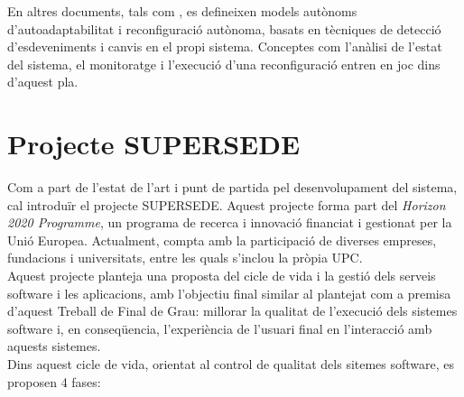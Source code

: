 En altres documents, tals com \cite{ibm}, es defineixen models autònoms d’autoadaptabilitat i reconfiguració autònoma, basats en tècniques de detecció d’esdeveniments i canvis en el propi sistema. Conceptes com l’anàlisi de l’estat del sistema, el monitoratge i l’execució d’una reconfiguració entren en joc dins d’aquest pla.


\section{Projecte SUPERSEDE}

Com a part de l'estat de l'art i punt de partida pel desenvolupament del sistema, cal introduïr el projecte SUPERSEDE\cite{supersede}. Aquest projecte forma part del \textit{Horizon 2020 Programme}\cite{horizon}, un programa de recerca i innovació financiat i gestionat per la Unió Europea. Actualment, compta amb la participació de diverses empreses, fundacions i universitats, entre les quals s'inclou la pròpia UPC. \\

Aquest projecte planteja una proposta del cicle de vida i la gestió dels serveis software i les aplicacions, amb l'objectiu final similar al plantejat com a premisa d'aquest Treball de Final de Grau: millorar la qualitat de l'execució dels sistemes software i, en conseqüencia, l'experiència de l'usuari final en l'interacció amb aquests sistemes. \\

Dins aquest cicle de vida, orientat al control de qualitat dels sitemes software, es proposen 4 fases:

